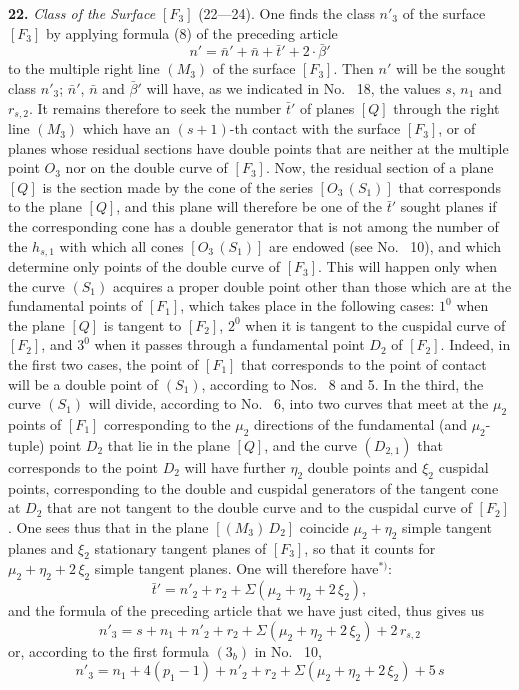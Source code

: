 \documentclass{article}
\begin{document}
\textbf{22.} \emph{Class of the Surface $[F_3]$} (22---24). One finds the class $n'_3$ of the surface $[F_3]$ by applying formula (8) of the preceding article
\[
n' = \bar{n}' + \bar{n} + \bar{t}' + 2\cdot \bar{\beta}'
\]
to the multiple right line $(M_3)$ of the surface $[F_3]$. Then $n'$ will be the sought class $n'_3$; $\bar{n}'$, $\bar{n}$ and $\bar{\beta}'$ will have, as we indicated in No.~ 18, the values $s$, $n_1$ and $r_{s, 2}$. It remains therefore to seek the number $\bar{t}'$ of planes $[Q]$ through the right line $(M_3)$ which have an $(s + 1)$-th contact with the surface $[F_3]$, or of planes whose residual sections have double points that are neither at the multiple point $O_3$ nor on the double curve of $[F_3]$. Now, the residual section of a plane $[Q]$ is the section made by the cone of the series $[O_3\,(S_1)]$ that corresponds to the plane $[Q]$, and this plane will therefore be one of the $\bar{t}'$ sought planes if the corresponding cone has a double generator that is not among the number of the $h_{s, 1}$ with which all cones $[O_3\,(S_1)]$ are endowed (see No.~ 10), and which determine only points of the double curve of $[F_3]$. This will happen only when the curve $(S_1)$ acquires a proper double point other than those which are at the fundamental points of $[F_1]$, which takes place in the following cases: $1^0$ when the plane $[Q]$ is tangent to $[F_2]$, $2^0$ when it is tangent to the cuspidal curve of $[F_2]$, and $3^0$ when it passes through a fundamental point $D_2$ of $[F_2]$. Indeed, in the first two cases, the point of $[F_1]$ that corresponds to the point of contact will be a double point of $(S_1)$, according to Nos.~ 8 and 5. In the third, the curve $(S_1)$ will divide, according to No.~ 6, into two curves that meet at the $\mu_2$ points of $[F_1]$ corresponding to the $\mu_2$ directions of the fundamental (and $\mu_2$-tuple) point $D_2$ that lie in the plane $[Q]$, and the curve $(D_{2, 1})$ that corresponds to the point $D_2$ will have further $\eta_2$ double points and $\xi_2$ cuspidal points, corresponding to the double and cuspidal generators of the tangent cone at $D_2$ that are not tangent to the double curve and to the cuspidal curve of $[F_2]$. One sees thus that in the plane $[(M_3)\,D_2]$ coincide $\mu_2 + \eta_2$ simple tangent planes and $\xi_2$ stationary tangent planes of $[F_3]$, so that it counts for $\mu_2 + \eta_2 + 2\,\xi_2$ simple tangent planes. One will therefore have${}^{*)}$:
\[
\bar{t}' = n'_2 + r_2 + \Sigma(\mu_2 + \eta_2 + 2\,\xi_2),
\]
and the formula of the preceding article that we have just cited, thus gives us
\[
n'_3 = s + n_1 + n'_2 + r_2 + \Sigma(\mu_2 + \eta_2 + 2\,\xi_2) + 2\,r_{s, 2} \tag{$6_a$}
\]
or, according to the first formula $(3_b)$ in No.~ 10,
\[
n'_3 = n_1 + 4(p_1 - 1) + n'_2 + r_2 + \Sigma(\mu_2 + \eta_2 + 2\,\xi_2) + 5\,s \tag{$6_b$}
\]
\end{document}
